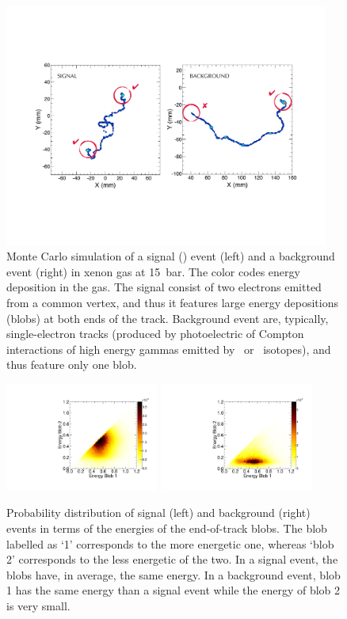 \documentclass{JINST}
\begin{document}
\begin{figure}[!htb]
\centering
\includegraphics[width= 0.95\textwidth]{img/TrackSignature.pdf}
\caption{Monte Carlo simulation of a signal (\bbonu) event (left) and a  background event (right) in xenon gas at 15~bar. The color codes energy deposition in the gas. The signal consist of two electrons emitted from a common vertex, and thus it features large energy depositions  (blobs) at both ends of the track. Background event are, typically, single-electron tracks (produced by photoelectric of Compton interactions of high energy gammas emitted by \BI\ or \TL\ isotopes), and thus feature only one blob.} \label{fig.ETRK2}
\end{figure}

\begin{figure}[!htb]
\centering
\includegraphics[width=0.45\textwidth]{img/EnergyBlobsSignal.pdf}
\includegraphics[width=0.45\textwidth]{img/EnergyBlobsTl208.pdf}
\caption{Probability distribution of signal (left) and background (right) events in terms of the energies of the end-of-track blobs. The blob labelled as `1' corresponds to the more energetic one, whereas `blob 2' corresponds to the less energetic of the two. In a signal event, the blobs have, in average, the same energy. In a background event, blob 1 has the same energy than a signal event while the energy of blob 2 is very small.} \label{fig.BLOBS}
\end{figure}
\end{document}
